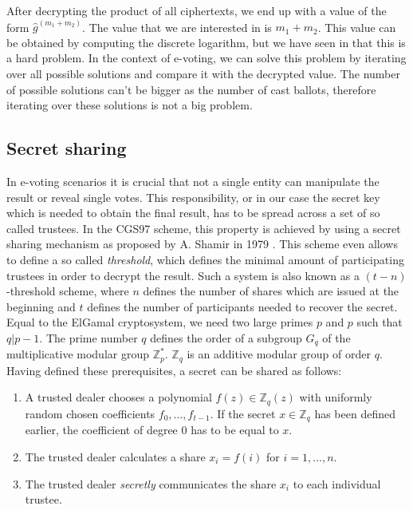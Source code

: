 \documentclass[numbers=noenddot, abstract=on, a4paper, headsepline,
footsepline, oneside, draft=off]{scrreprt}
\begin{document}
After decrypting the product of all ciphertexts, we end up with a value of the
form $\hat{g}^{(m_1+m_2)}$. The value that we are interested in is $m_1+m_2$.
This value can be obtained by computing the discrete logarithm, but we have seen in
 that this is a hard problem. In the context of
e-voting, we can solve this problem by iterating over all possible solutions and
compare it with the decrypted value. The number of possible solutions can't be
bigger as the number of cast ballots, therefore iterating over these solutions
is not a big problem.


\subsection{Secret sharing}
\label{sec:secretsharing}
In e-voting scenarios it is crucial that not a
single entity can manipulate the result or reveal single votes. This
responsibility, or in our case the secret key which is needed to obtain the
final result, has to be spread across a set of so called trustees. In the CGS97
scheme, this property is achieved by using a secret sharing mechanism as
proposed by A. Shamir in 1979 \cite{Shamir79}. This scheme even allows to define a so called
\textit{threshold}, which defines the minimal amount of participating trustees
in order to decrypt the result. Such a system is also known as a
$(t-n)$-threshold scheme, where $n$ defines the number of shares which are
issued at the beginning and $t$ defines the number of participants needed to
recover the secret. Equal to the ElGamal cryptosystem, we need two large primes
$p$ and $p$ such that $q|p-1$. The prime number $q$ defines the order of a
subgroup $G_q$ of the multiplicative modular group $\mathbb{Z}^*_p$.
$\mathbb{Z}_q$ is an additive modular group of order $q$. Having defined these
prerequisites, a secret can be shared as follows:
\begin{enumerate}
  \item A trusted dealer chooses a polynomial $f(z) \in \mathbb{Z}_q(z)$ with
  uniformly random chosen coefficients $f_0, \ldots, f_{t-1}$.
  If the secret $x \in \mathbb{Z}_q$ has been defined earlier, the coefficient of degree $0$ has to
  be equal to $x$.
  \item The trusted dealer calculates a share $x_i = f(i)$ for $i = 1,\ldots,
  n$.
  \item The trusted dealer \emph{secretly} communicates the share $x_i$ to each
  individual trustee.
\end{enumerate}
\end{document}

